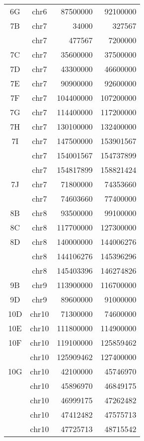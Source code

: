 \begin{center}
\begin{longtable}{@{\extracolsep{\fill}}ccrr}
  6G     & chr6       & 87500000  & 92100000 \\
  7B     & chr7       & 34000     & 327567 \\
         & chr7       & 477567    & 7200000 \\
  7C     & chr7       & 35600000  & 37500000 \\
  7D     & chr7       & 43300000  & 46600000 \\
  7E     & chr7       & 90900000  & 92600000 \\
  7F     & chr7       & 104400000 & 107200000 \\
  7G     & chr7       & 114400000 & 117200000 \\
  7H     & chr7       & 130100000 & 132400000 \\
  7I     & chr7       & 147500000 & 153901567 \\
         & chr7       & 154001567 & 154737899 \\
         & chr7       & 154817899 & 158821424 \\
  7J     & chr7       & 71800000  & 74353660 \\
         & chr7       & 74603660  & 77400000 \\
  8B     & chr8       & 93500000  & 99100000 \\
  8C     & chr8       & 117700000 & 127300000 \\
  8D     & chr8       & 140000000 & 144006276 \\
         & chr8       & 144106276 & 145396296 \\
         & chr8       & 145403396 & 146274826 \\
  9B     & chr9       & 113900000 & 116700000 \\
  9D     & chr9       & 89600000  & 91000000 \\
  10D    & chr10      & 71300000  & 74600000 \\
  10E    & chr10      & 111800000 & 114900000 \\
  10F    & chr10      & 119100000 & 125859462 \\
         & chr10      & 125909462 & 127400000 \\
  10G    & chr10      & 42100000  & 45746970 \\
         & chr10      & 45896970  & 46849175 \\
         & chr10      & 46999175  & 47262482 \\
         & chr10      & 47412482  & 47575713 \\
         & chr10      & 47725713  & 48715542 \\

\end{longtable}
\end{center}
